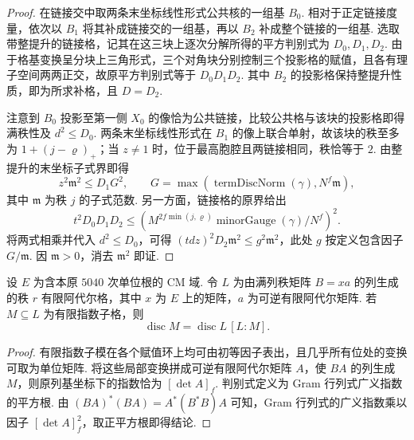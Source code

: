 \begin{proof}
在链接交中取两条末坐标线性形式公共核的一组基 $B_0$. 相对于正定链接度量，依次以 $B_1$ 将其补成链接交的一组基，再以 $B_2$ 补成整个链接的一组基. 选取带整提升的链接格，记其在这三块上逐次分解所得的平方判别式为 $D_0,D_1,D_2$. 由于格基变换呈分块上三角形式，三个对角块分别控制三个投影格的赋值，且各有理子空间两两正交，故原平方判别式等于 $D_0D_1D_2$. 其中 $B_2$ 的投影格保持整提升性质，即为所求补格，且 $D=D_2$.

注意到 $B_0$ 投影至第一侧 $X_0$ 的像恰为公共链接，比较公共格与该块的投影格即得满秩性及 $d^2\le D_0$. 两条末坐标线性形式在 $B_1$ 的像上联合单射，故该块的秩至多为 $1+(j-\varrho)_+$；当 $z\ne1$ 时，位于最高胞腔且两链接相同，秩恰等于 $2$. 由整提升的末坐标子式界即得
\[
 z^2\mathfrak m^2\le D_1G^2,\qquad
 G=\max(\operatorname{termDiscNorm}(\gamma),N^f\mathfrak m),
\]
其中 $\mathfrak m$ 为秩 $j$ 的子式范数. 另一方面，链接格的原界给出
\[
 t^2D_0D_1D_2\le
 \left(M^{2f\min(j,\varrho)}\operatorname{minorGauge}(\gamma)/N^f\right)^2 .
\]
将两式相乘并代入 $d^2\le D_0$，可得 $(tdz)^2D_2\mathfrak m^2\le g^2\mathfrak m^2$，此处 $g$ 按定义包含因子 $G/\mathfrak m$. 因 $\mathfrak m>0$，消去 $\mathfrak m^2$ 即证.
\end{proof}

\begin{lemma}[子格指数与判别式]
\label{lem:b-discriminant-index}
\emitthmsource
设 $E$ 为含本原 $5040$ 次单位根的 CM 域. 令 $L$ 为由满列秩矩阵 $B=xa$ 的列生成的秩 $r$ 有限阿代尔格，其中 $x$ 为 $E$ 上的矩阵，$a$ 为可逆有限阿代尔矩阵. 若 $M\subseteq L$ 为有限指数子格，则
\[
 \operatorname{disc}M=\operatorname{disc}L\,[L:M].
\]
\end{lemma}
\begin{proof}
有限指数子模在各个赋值环上均可由初等因子表出，且几乎所有位处的变换可取为单位矩阵. 将这些局部变换拼成可逆有限阿代尔矩阵 $A$，使 $BA$ 的列生成 $M$，则原列基坐标下的指数恰为 $[\det A]_f$. 判别式定义为 Gram 行列式广义指数的平方根. 由 $(BA)^*(BA)=A^*(B^*B)A$ 可知，Gram 行列式的广义指数乘以因子 $[\det A]_f^2$，取正平方根即得结论.
\end{proof}

